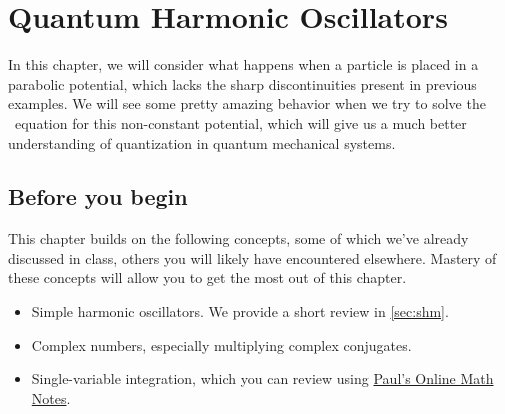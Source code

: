 

%

\chapter{Quantum Harmonic Oscillators} \label{ch:qho}
In this chapter, we will consider what happens when a particle is placed in a parabolic potential, which lacks the sharp discontinuities present in previous examples. 
We will see some pretty amazing behavior when we try to solve the \Sch\ equation for this non-constant potential, which will give us a much better understanding of quantization in quantum mechanical systems.


\section{Before you begin}

This chapter builds on the following concepts, some of which we've already discussed in class, others you will likely have encountered elsewhere.
Mastery of these concepts will allow you to get the most out of this chapter.

\begin{itemize}
	\item Simple harmonic oscillators.
	We provide a short review in \autoref{sec:shm}.
	
	\item Complex numbers, especially multiplying complex conjugates.
	
	\item Single-variable integration, which you can review using \href{https://tutorial.math.lamar.edu/Classes/CalcII/IntTechIntro.aspx}{Paul's Online Math Notes}.
\end{itemize}

